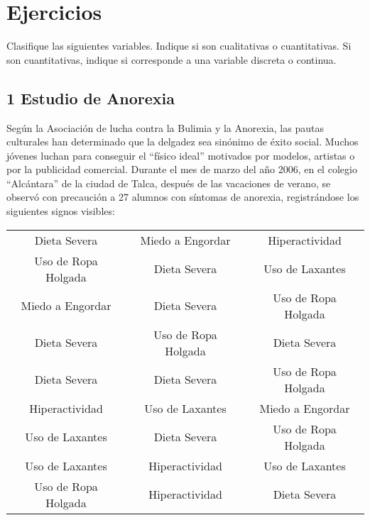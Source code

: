 \documentclass{templateNote}
\begin{document}
\portada
\margenes %

\section{Ejercicios}
Clasifique las siguientes variables. Indique si son cualitativas o cuantitativas. Si son cuantitativas, indique si corresponde a una variable discreta o continua.
\begin{samepage}
    \subsection{1 Estudio de Anorexia}
    \indent
    Según la Asociación de lucha contra la Bulimia y la Anorexia, las pautas culturales
    han determinado que la delgadez sea sinónimo de éxito social. Muchos jóvenes luchan para
    conseguir el “físico ideal” motivados por modelos, artistas o por la publicidad comercial.
    Durante el mes de marzo del año 2006, en el colegio “Alcántara” de la ciudad de Talca,
    después de las vacaciones de verano, se observó con precaución a 27 alumnos con síntomas
    de anorexia, registrándose los siguientes signos visibles:

    \begin{table}[H]
        \begin{center}
            \begin{tabular}{| c | c | c |}
                \hline Dieta Severa & Miedo a Engordar & Hiperactividad \\
                Uso de Ropa Holgada & Dieta Severa & Uso de Laxantes \\
                Miedo a Engordar & Dieta Severa & Uso de Ropa Holgada \\
                Dieta Severa & Uso de Ropa Holgada & Dieta Severa \\
                Dieta Severa & Dieta Severa & Uso de Ropa Holgada \\
                Hiperactividad & Uso de Laxantes & Miedo a Engordar \\
                Uso de Laxantes & Dieta Severa & Uso de Ropa Holgada \\
                Uso de Laxantes & Hiperactividad & Uso de Laxantes \\
                Uso de Ropa Holgada & Hiperactividad & Dieta Severa \\ \hline
            \end{tabular}
        \end{center}
    \end{table}

\end{samepage}
\end{document}

